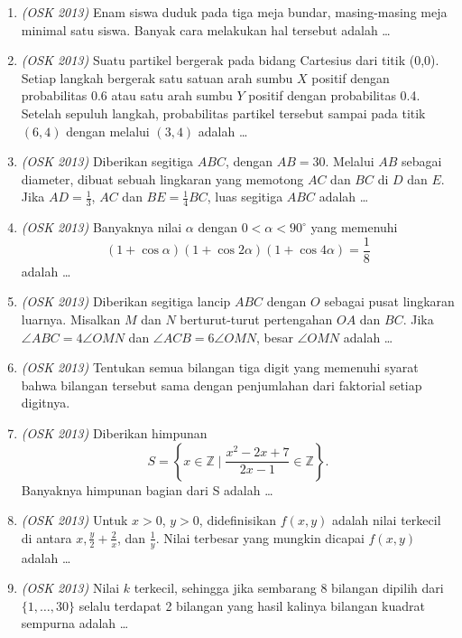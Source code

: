 \documentclass[11pt]{scrartcl}
\begin{document}
\begin{enumerate}
\item \textit{(OSK 2013)} Enam siswa duduk pada tiga meja bundar, masing-masing meja minimal satu siswa. Banyak cara melakukan hal tersebut adalah \dots

\item \textit{(OSK 2013)} Suatu partikel bergerak pada bidang Cartesius dari titik (0,0). Setiap langkah bergerak satu satuan arah sumbu $X$ positif dengan probabilitas 0.6 atau satu arah sumbu $Y$ positif dengan probabilitas 0.4. Setelah sepuluh langkah, probabilitas partikel tersebut sampai pada titik $(6,4)$ dengan melalui $(3,4)$ adalah \dots

\item \textit{(OSK 2013)} Diberikan segitiga $ABC$, dengan $AB = 30$. Melalui $AB$ sebagai diameter, dibuat sebuah lingkaran yang memotong $AC$ dan $BC$ di $D$ dan $E$. Jika $AD = \frac{1}{3}$, $AC$ dan $BE = \frac{1}{4}BC$, luas segitiga $ABC$ adalah \dots

\item \textit{(OSK 2013)} Banyaknya nilai $\alpha$ dengan $0 < \alpha < 90^\circ$ yang memenuhi 
\[
(1 + \cos \alpha)(1 + \cos 2\alpha)(1 + \cos 4\alpha) = \frac{1}{8}
\]
adalah \dots

\item \textit{(OSK 2013)} Diberikan segitiga lancip $ABC$ dengan $O$ sebagai pusat lingkaran luarnya. Misalkan $M$ dan $N$ berturut-turut pertengahan $OA$ dan $BC$. Jika $\angle ABC = 4\angle OMN$ dan $\angle ACB = 6\angle OMN$, besar $\angle OMN$ adalah \dots

\item \textit{(OSK 2013)} Tentukan semua bilangan tiga digit yang memenuhi syarat bahwa bilangan tersebut sama dengan penjumlahan dari faktorial setiap digitnya.

\item \textit{(OSK 2013)} Diberikan himpunan
\[
S = \left\{ x \in \mathbb{Z} \mid \frac{x^2 - 2x + 7}{2x - 1} \in \mathbb{Z} \right\}.\]
Banyaknya himpunan bagian dari S adalah \dots

\item \textit{(OSK 2013)} Untuk $x > 0$, $y > 0$, didefinisikan $f(x,y)$ adalah nilai terkecil di antara $x, \frac{y}{2}+\frac{2}{x}$, dan $\frac{1}{y}$. Nilai terbesar yang mungkin dicapai $f(x,y)$ adalah \dots

\item \textit{(OSK 2013)} Nilai $k$ terkecil, sehingga jika sembarang 8 bilangan dipilih dari $\{1,\dots,30\}$ selalu terdapat 2 bilangan yang hasil kalinya bilangan kuadrat sempurna adalah \dots


\end{enumerate}
\end{document}
